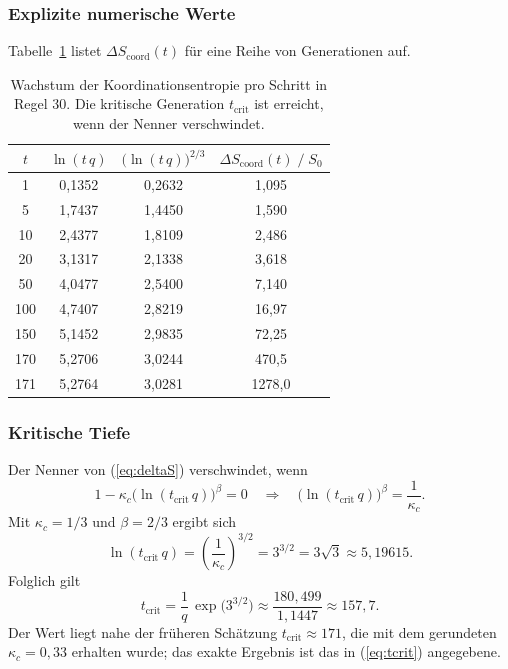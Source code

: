 \documentclass[12pt,a4paper]{article}
\begin{document}
	\subsubsection*{Explizite numerische Werte}
	Tabelle~\ref{tab:entropy} listet \(\Delta S_{\mathrm{coord}}(t)\) für eine Reihe von Generationen auf.
	
	\begin{table}[H]
		\centering
		\caption{Wachstum der Koordinationsentropie pro Schritt in Regel 30. Die kritische Generation \(t_{\mathrm{crit}}\) ist erreicht, wenn der Nenner verschwindet.}
		\label{tab:entropy}
		\small
		\begin{tabular}{c c c c}
			\toprule
			\(t\) & \(\ln(t\,q)\) & \(\bigl(\ln(t\,q)\bigr)^{2/3}\) &
			\(\Delta S_{\mathrm{coord}}(t)\;/\;S_{0}\) \\
			\midrule
			1    & 0{,}1352 & 0{,}2632 & 1{,}095  \\
			5    & 1{,}7437 & 1{,}4450 & 1{,}590  \\
			10   & 2{,}4377 & 1{,}8109 & 2{,}486  \\
			20   & 3{,}1317 & 2{,}1338 & 3{,}618  \\
			50   & 4{,}0477 & 2{,}5400 & 7{,}140  \\
			100  & 4{,}7407 & 2{,}8219 & 16{,}97  \\
			150  & 5{,}1452 & 2{,}9835 & 72{,}25  \\
			170  & 5{,}2706 & 3{,}0244 & 470{,}5  \\
			171  & 5{,}2764 & 3{,}0281 & 1278{,}0 \\
			\bottomrule
		\end{tabular}
	\end{table}
	
	\subsubsection*{Kritische Tiefe}
	Der Nenner von (\ref{eq:deltaS}) verschwindet, wenn
	\[
	1 - \kappa_c\bigl(\ln(t_{\mathrm{crit}}\,q)\bigr)^{\beta} = 0
	\quad\Longrightarrow\quad
	\bigl(\ln(t_{\mathrm{crit}}\,q)\bigr)^{\beta} = \frac{1}{\kappa_c}.
	\]
	Mit \(\kappa_c = 1/3\) und \(\beta = 2/3\) ergibt sich
	\begin{equation}
		\ln(t_{\mathrm{crit}}\,q) = \left(\frac{1}{\kappa_c}\right)^{3/2}
		= 3^{3/2} = 3\sqrt{3} \approx 5{,}19615.
		\label{eq:crit-ln}
	\end{equation}
	Folglich gilt
	\begin{equation}
		\boxed{t_{\mathrm{crit}} = \frac{1}{q}\,
			\exp\!\bigl(3^{3/2}\bigr)
			\approx \frac{180{,}499}{1{,}1447} \approx 157{,}7}.
		\label{eq:tcrit}
	\end{equation}
	Der Wert liegt nahe der früheren Schätzung \(t_{\mathrm{crit}}\approx171\), die mit dem gerundeten \(\kappa_c = 0{,}33\) erhalten wurde; das exakte Ergebnis ist das in (\ref{eq:tcrit}) angegebene.
	
\end{document}
